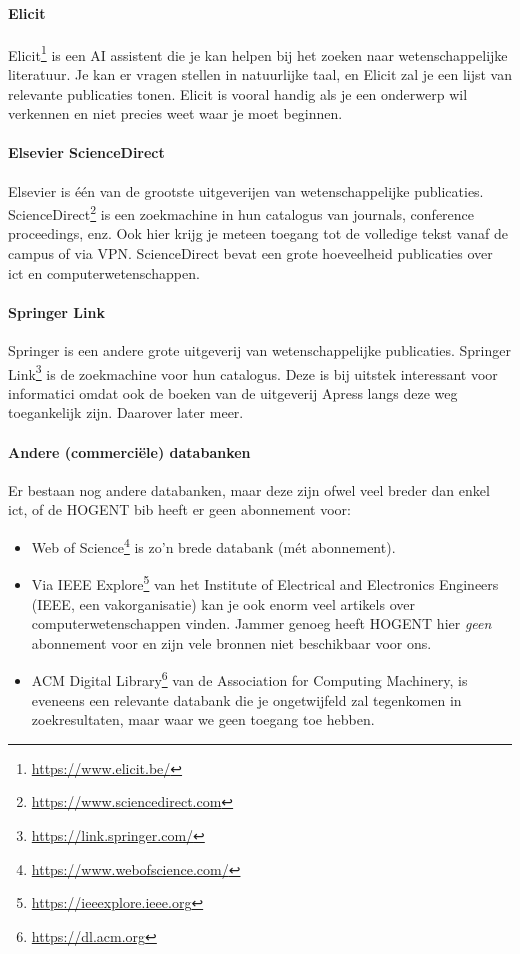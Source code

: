 \paragraph{Elicit}

Elicit\footnote{\url{https://www.elicit.be/}} is een AI assistent die je kan helpen bij het zoeken naar wetenschappelijke literatuur. Je kan er vragen stellen in natuurlijke taal, en Elicit zal je een lijst van relevante publicaties tonen. Elicit is vooral handig als je een onderwerp wil verkennen en niet precies weet waar je moet beginnen.

\paragraph{Elsevier ScienceDirect}

Elsevier is één van de grootste uitgeverijen van wetenschappelijke publicaties. ScienceDirect\footnote{\url{https://www.sciencedirect.com}} is een zoekmachine in hun catalogus van journals, conference proceedings, enz. Ook hier krijg je meteen toegang tot de volledige tekst vanaf de campus of via VPN. ScienceDirect bevat een grote hoeveelheid publicaties over ict en computerwetenschappen.

\paragraph{Springer Link}

Springer is een andere grote uitgeverij van wetenschappelijke publicaties. Springer Link\footnote{\url{https://link.springer.com/}} is de zoekmachine voor hun catalogus. Deze is bij uitstek interessant voor informatici omdat ook de boeken van de uitgeverij Apress langs deze weg toegankelijk zijn. Daarover later meer.

\paragraph{Andere (commerciële) databanken}

Er bestaan nog andere databanken, maar deze zijn ofwel veel breder dan enkel ict, of de HOGENT bib heeft er geen abonnement voor:

\begin{itemize}
  \item Web of Science\footnote{\url{https://www.webofscience.com/}} is zo'n brede databank (mét abonnement).
  \item Via IEEE Explore\footnote{\url{https://ieeexplore.ieee.org}} van het Institute of Electrical and Electronics Engineers (IEEE, een vakorganisatie) kan je ook enorm veel artikels over computerwetenschappen vinden. Jammer genoeg heeft HOGENT hier \textit{geen} abonnement voor en zijn vele bronnen niet beschikbaar voor ons.
  \item ACM Digital Library\footnote{\url{https://dl.acm.org}} van de Association for Computing Machinery, is eveneens een relevante databank die je ongetwijfeld zal tegenkomen in zoekresultaten, maar waar we geen toegang toe hebben.
\end{itemize}

